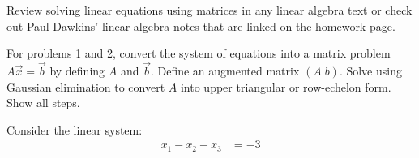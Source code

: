 \documentclass[
	number={1},
	title={Review of Matrices}
]{/mnt/d/Academic/math486/src/styles/tex/latex/math486homework/math486homework.cls}
\begin{document}
\maketitle

\noindent Review solving linear equations using matrices in any linear algebra text or check out Paul Dawkins' linear algebra notes that are linked on the homework page.

For problems 1 and 2, convert the system of equations into a matrix problem $A\vec{x}=\vec{b}$ by defining $A$ and $\vec{b}$.
Define an augmented matrix $(A|b)$.
Solve using Gaussian elimination to convert $A$ into upper triangular or row-echelon form.
Show all steps.

\begin{problems}
	\problem Consider the linear system:
	\begin{equation*}
	\begin{aligned}
		x_{1} - x_{2} - x_{3} &= -3\\
	\end{aligned}
	\end{equation*}
\end{problems}
\end{document}
